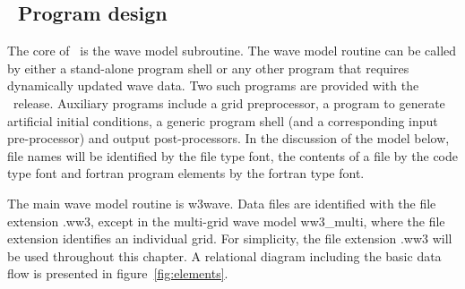 \vsssub
\subsection{~Program design} \label{run:design}
\vssub

The core of \ws\ is the wave model subroutine. The wave model routine can be
called by either a stand-alone program shell or any other program that
requires dynamically updated wave data. Two such programs are provided with
the \ws\ release. Auxiliary programs include a grid preprocessor, a program to
generate artificial initial conditions, a generic program shell (and a
corresponding input pre-processor) and output post-processors.  In the
discussion of the model below, file names will be identified by the {\file
file} type font, the contents of a file by the {\code code} type font and {\sc
fortran} program elements by the {\F fortran} type font.

The main wave model routine is {\F w3wave}. Data files are identified with the
file extension {\file .ww3}, except in the multi-grid wave model {\file
ww3\_multi}, where the file extension identifies an individual grid. For
simplicity, the file extension {\file .ww3} will be used throughout this
chapter.  A relational diagram including the basic data flow is presented in
figure~\ref{fig:elements}.

